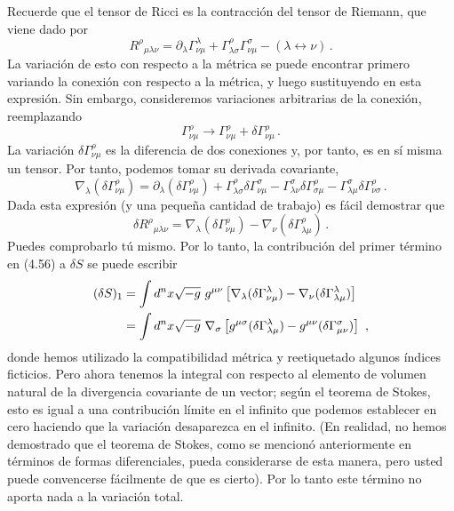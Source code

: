 \documentclass[11pt,b5paper,openany,twoside]{book}
\newcommand{\mn}{{\mu\nu}}
\newcommand{\p}[1]{{\partial_{#1}}}
\def\g{{\sqrt{-g}}}
\begin{document}
Recuerde que el tensor de Ricci es la contracción del tensor de Riemann, que viene dado por
\begin{equation}
R^\rho{}_{\mu\lambda\nu} = \p\lambda \Gamma^\lambda_{\nu\mu}
+\Gamma^\rho_{\lambda\sigma}\Gamma^\sigma_{\nu\mu}
- (\lambda \leftrightarrow \nu)\,.\label{4.57}
\end{equation}
La variación de esto con respecto a la métrica se puede encontrar primero variando la conexión con respecto a la métrica, y luego sustituyendo en esta expresión.
Sin embargo, consideremos variaciones arbitrarias de la conexión, reemplazando
\begin{equation}
\Gamma^\rho_{\nu\mu}\rightarrow \Gamma^\rho_{\nu\mu}+
\delta\Gamma^\rho_{\nu\mu}\,.\label{4.58}
\end{equation}
La variación $\delta\Gamma^\rho_{\nu\mu}$ es la diferencia de dos conexiones y, por tanto, es en sí misma un tensor.
Por tanto, podemos tomar su derivada covariante,
\begin{equation}
\nabla_\lambda(\delta\Gamma^\rho_{\nu\mu})=
\p\lambda(\delta\Gamma^\rho_{\nu\mu})
+\Gamma^\rho_{\lambda\sigma}\delta\Gamma^\sigma_{\nu\mu}
-\Gamma^\sigma_{\lambda\nu}\delta\Gamma^\rho_{\sigma\mu}
-\Gamma^\sigma_{\lambda\mu}\delta\Gamma^\rho_{\nu\sigma}\,.
\label{4.59}
\end{equation}
Dada esta expresión (y una pequeña cantidad de trabajo) es fácil demostrar que
\begin{equation}
\delta R^\rho{}_{\mu\lambda\nu}=
\nabla_\lambda(\delta\Gamma^\rho_{\nu\mu})
-\nabla_\nu(\delta\Gamma^\rho_{\lambda\mu})\,.\label{4.60}
\end{equation}
Puedes comprobarlo tú mismo.
Por lo tanto, la contribución del primer término en (4.56) a $\delta S$ se puede escribir
\begin{align}
(\delta S)_1  &=
\int d^nx \g ~g^\mn \left[\nabla_\lambda(
\delta\Gamma^\lambda_{\nu\mu})
-\nabla_\nu(\delta\Gamma^\lambda_{\lambda\mu})\right] \notag \\
&=  \int d^nx \g ~ {\nabla_\sigma}\left[g^{\mu\sigma}(\delta
\Gamma^\lambda_{\lambda\mu}) - g^{\mn}(\delta
\Gamma^\sigma_{\mu\nu})\right]\ , \label{4.61}
\end{align}
donde hemos utilizado la compatibilidad métrica y reetiquetado algunos índices ficticios.
Pero ahora tenemos la integral con respecto al elemento de volumen natural de la divergencia covariante de un vector; según el teorema de Stokes, esto es igual a una contribución límite en el infinito que podemos establecer en cero haciendo que la variación desaparezca en el infinito.
(En realidad, no hemos demostrado que el teorema de Stokes, como se mencionó anteriormente en términos de formas diferenciales, pueda considerarse de esta manera, pero usted puede convencerse fácilmente de que es cierto).
Por lo tanto este término no aporta nada a la variación total.
\end{document}
